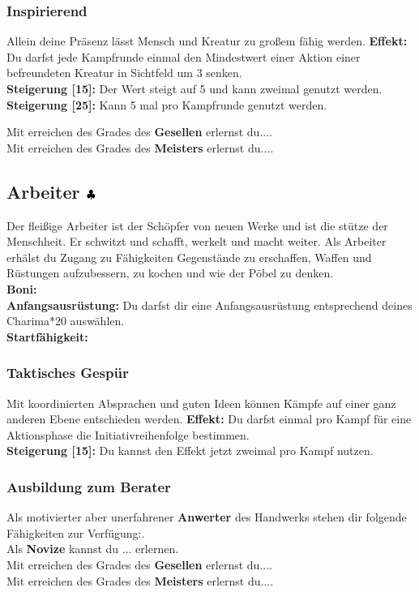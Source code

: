 \subsubsection*{Inspirierend} \label{sk:inspirierend}
Allein deine Präsenz lässt Mensch und Kreatur zu großem fähig werden.
\textbf{Effekt:} Du darfst jede Kampfrunde einmal den Mindestwert einer Aktion einer befreundeten Kreatur in Sichtfeld um 3 senken.\\
\textbf{Steigerung [15]:} Der Wert steigt auf 5 und kann zweimal genutzt werden.\\
\textbf{Steigerung [25]:} Kann 5 mal pro Kampfrunde genutzt werden.

Mit erreichen des Grades des \textbf{Gesellen} erlernst du....\\


Mit erreichen des Grades des \textbf{Meisters} erlernst du....\\


\subsection*{Arbeiter ${\color{blue} }{\color{black}\clubsuit}$}
Der fleißige Arbeiter ist der Schöpfer von neuen Werke und ist die stütze der Menschheit. Er schwitzt und schafft, werkelt und macht weiter. Als Arbeiter erhälst du Zugang zu Fähigkeiten Gegenstände zu erschaffen, Waffen und Rüstungen aufzubessern, zu kochen und wie der Pöbel zu denken.\\
\textbf{Boni:} \\
\textbf{Anfangsausrüstung:} Du darfst dir eine Anfangsausrüstung entsprechend deines Charima*20 auswählen. \\
\textbf{Startfähigkeit:}  \\

\subsubsection*{Taktisches Gespür} \label{sk:taktisches_gespür}
Mit koordinierten Absprachen und guten Ideen können Kämpfe auf einer ganz anderen Ebene entschieden werden.
\textbf{Effekt:} Du darfst einmal pro Kampf für eine Aktionsphase die Initiativreihenfolge bestimmen.\\
\textbf{Steigerung [15]:} Du kannst den Effekt jetzt zweimal pro Kampf nutzen.

\subsubsection*{Ausbildung zum Berater}
Als motivierter aber unerfahrener \textbf{Anwerter} des Handwerks stehen dir folgende Fähigkeiten zur Verfügung:.\\
Als \textbf{Novize}  kannst du ... erlernen.\\
Mit erreichen des Grades des \textbf{Gesellen} erlernst du....\\
Mit erreichen des Grades des \textbf{Meisters} erlernst du....\\

